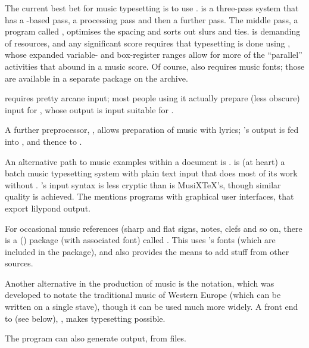 
The current best bet for music typesetting is to use
.   is a three-pass system that
has a \tex{}-based pass, a processing pass and then a further \tex{}
pass.  The middle pass, a program called ,
optimises the spacing and sorts out slurs and ties.
 is demanding of \tex{} resources, and any
significant score requires that typesetting is done using \etex{},
whose expanded variable- and box-register ranges allow for more of the
``parallel'' activities that abound in a music score.
Of course,  also requires music fonts; those are
available in a separate package on the archive.

 requires pretty arcane input; most people using it
actually prepare (less obscure) input for , whose output
is \tex{} input suitable for .

A further preprocessor, , allows preparation of music
with lyrics; 's output is fed into , and
thence to .

An alternative path to music examples within a \alltex{} document is
\href{http://www.lilypond.org}{}.
 is (at heart) a batch music typesetting system
with plain text input that does most of its work without \tex{}.
's input syntax is less cryptic than is
MusiX\TeX{}'s, though similar quality is achieved.  The
\href{http://lilypond.org/web/about/faq}{} mentions programs
with graphical user interfaces, that export lilypond output.

For occasional music references (sharp and flat signs, notes, clefs
and so on, there is a (\latex{}) package (with associated font) called
.  This uses 's fonts (which
are included in the package), and also provides the means to add stuff
from other sources.

Another alternative in the production of music is the 
notation, which was developed to notate the traditional music of
Western Europe (which can be written on a single stave), though it can
be used much more widely.  A front end to  (see
below), , makes  typesetting possible.

The program  can also generate 
output, from  files.

